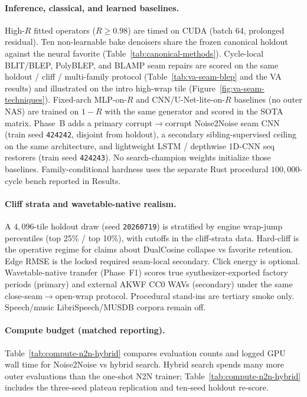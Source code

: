 \paragraph{Inference, classical, and learned baselines.}
High-$R$ fitted operators ($R\ge 0.98$) are timed on CUDA (batch 64, prolonged residual).
Ten non-learnable bake denoisers share the frozen canonical holdout against the neural favorite (Table~\ref{tab:canonical-methods}).
Cycle-local BLIT/BLEP, PolyBLEP, and BLAMP seam repairs are scored on the same holdout / cliff / multi-family protocol (Table~\ref{tab:va-seam-blep} and the VA results) and illustrated on the intro high-wrap tile (Figure~\ref{fig:va-seam-techniques}).
Fixed-arch MLP-on-$R$ and CNN/U-Net-lite-on-$R$ baselines (no outer NAS) are trained on $1{-}R$ with the same generator and scored in the SOTA matrix.
Phase~B adds a primary corrupt$\to$corrupt Noise2Noise seam CNN (train seed \texttt{424242}, disjoint from holdout), a secondary sibling-supervised ceiling on the same architecture, and lightweight LSTM / depthwise 1D-CNN seq restorers (train seed \texttt{424243}).
No search-champion weights initialize those baselines.
Family-conditional hardness uses the separate Rust procedural $100{,}000$-cycle bench reported in Results.

\paragraph{Cliff strata and wavetable-native realism.}
A $4{,}096$-tile holdout draw (seed \texttt{20260719}) is stratified by engine wrap-jump percentiles (top 25\% / top 10\%), with cutoffs in the cliff-strata data.
Hard-cliff is the operative regime for claims about DualCosine collapse vs favorite retention.
Edge RMSE is the locked required seam-local secondary. Click energy is optional.
Wavetable-native transfer (Phase~F1) scores true synthesizer-exported factory periods (primary) and external AKWF CC0 WAVs (secondary) under the same close-seam$\to$open-wrap protocol.
Procedural stand-ins are tertiary smoke only.
Speech/music LibriSpeech/MUSDB corpora remain off.


\paragraph{Compute budget (matched reporting).}
Table~\ref{tab:compute-n2n-hybrid} compares evaluation counts and logged GPU wall time for Noise2Noise vs hybrid search.
Hybrid search spends many more outer evaluations than the one-shot N2N trainer; Table~\ref{tab:compute-n2n-hybrid} includes the three-seed plateau replication and ten-seed holdout re-score.


